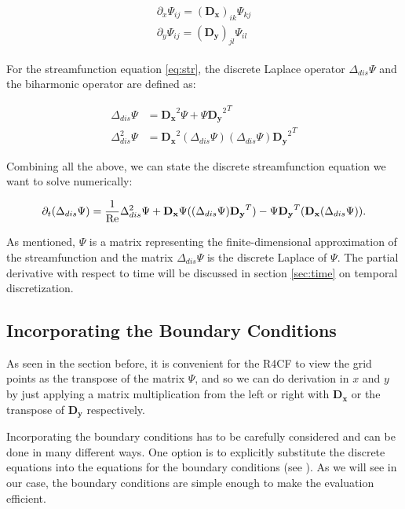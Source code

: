 \begin{align}
  \begin{split}
  \partial_x \Psi_{ij} = (\mathbf{D_x})_{ik} \Psi_{kj} \\
  \partial_y \Psi_{ij} = (\mathbf{D_y})_{jl} \Psi_{il}
  \end{split}
\label{eq:discr_der}
\end{align}

For the streamfunction equation \eqref{eq:str}, the discrete Laplace operator
$\Delta_{dis} \Psi$ and the biharmonic operator are defined as:

\begin{align}
  \Delta_{dis} \Psi &= \mathbf{D_x}^2\Psi + \Psi{\mathbf{D_y}^2}^T \\
  \Delta_{dis}^2 \Psi &= \mathbf{D_x}^2(\Delta_{dis} \Psi) (\Delta_{dis}
    \Psi){\mathbf{D_y}^2}^T 
\end{align}

Combining all the above, we can state the discrete streamfunction equation we
want to solve numerically:

\begin{align}
\partial_t (\Delta_{dis} \Psi) = \frac{1}{\mathrm{Re}} \Delta_{dis}^2 \Psi
  + \mathbf{D_x}\Psi((\Delta_{dis}\Psi)\mathbf{D_y}^T)
  - \Psi\mathbf{D_y}^T (\mathbf{D_x}(\Delta_{dis} \Psi)). 
\label{eq:str_dis}
\end{align}

As mentioned, $\Psi$ is a matrix representing the finite-dimensional
approximation of the streamfunction and the matrix $\Delta_{dis} \Psi$ is the
discrete Laplace of $\Psi$. The partial derivative with respect to time will be
discussed in section \ref{sec:time} on temporal discretization.

\subsection{Incorporating the Boundary Conditions} \label{sec:bc}

As seen in the section before, it is convenient for the R4CF to view the grid
points as the transpose of the matrix $\Psi$, and so we can do derivation in
$x$ and $y$ by just applying a matrix multiplication from the left or right
with $\mathbf{D_x}$ or the transpose of $\mathbf{D_y}$ respectively. 

Incorporating the boundary conditions has to be carefully considered and can be
done in many different ways. One option is to explicitly substitute the
discrete equations into the equations for the boundary conditions (see
\cite{meseguer2020}). As we will see in our case, the boundary conditions are
simple enough to make the evaluation efficient.


